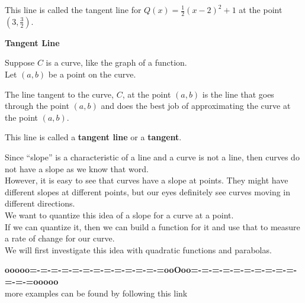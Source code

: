 \documentclass{ximera}
\begin{document}
This line is called the tangent line for $Q(x) = \frac{1}{2} (x - 2)^2 + 1$ at the point $\left( 3, \frac{3}{2} \right)$.




\begin{definition} \textbf{\textcolor{green!50!black}{Tangent Line}}


Suppose $C$ is a curve, like the graph of a function. \\

Let $(a, b)$ be a point on the curve.

The line tangent to the curve, $C$, at the point $(a, b)$ is the line that goes through the point $(a, b)$ and does the best job of approximating the curve at the point $(a, b)$.

This line is called a \textbf{tangent line} or a \textbf{tangent}.


\end{definition}


Since ``slope'' is a characteristic of a line and a curve is not a line, then curves do not have a slope as we know that word. \\

However, it is easy to see that curves have a slope at points. They might have different slopes at different points, but our eyes definitely see curves moving in different directions.\\

We want to quantize this idea of a slope for a curve at a point. \\

If we can quantize it, then we can build a function for it and use that to measure a rate of change for our curve. \\

We will first investigate this idea with quadratic functions and parabolas.






















\begin{center}
\textbf{\textcolor{green!50!black}{ooooo=-=-=-=-=-=-=-=-=-=-=-=-=ooOoo=-=-=-=-=-=-=-=-=-=-=-=-=ooooo}} \\

more examples can be found by following this link\\ 

\end{center}
\end{document}
